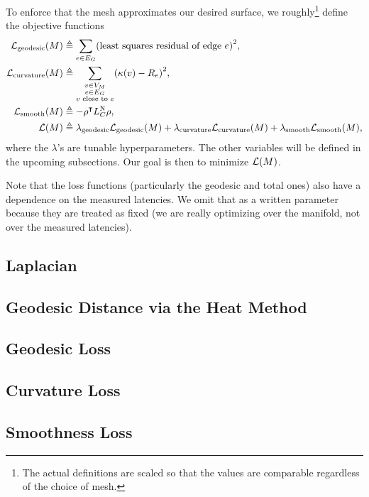 \documentclass[10pt]{article}
\newcommand*\delimeter[3]{
	\ensuremath{\mathopen{}\left#2 #1\right#3\mathclose{}{\vphantom{\left#2 #1\right#3}}}
}
\newcommand*\pof[1]{\delimeter{#1}{(}{)}}
\begin{document}
	To enforce that the mesh approximates our desired surface, we roughly\footnote{The actual definitions are scaled so that the values are comparable regardless of the choice of mesh.} define the objective functions \begin{align*}
		\mathcal{L}_{\mathrm{geodesic}}\pof{M} &\triangleq \sum_{e \in E_G} \pof{\text{least squares residual of edge \(e\)}}^2, \\
		\mathcal{L}_{\mathrm{curvature}}\pof{M} &\triangleq \sum_{\substack{v \in V_M \\ e \in E_G \\ \text{\(v\) close to \(e\)}}} \pof{\kappa\pof{v} - R_e}^2, \\
		\mathcal{L}_{\mathrm{smooth}}\pof{M} &\triangleq -\rho^\intercal L_C^{\text{N}}\rho, \\
		\mathcal{L}\pof{M} &\triangleq \lambda_{\mathrm{geodesic}}\mathcal{L}_{\mathrm{geodesic}}\pof{M} + \lambda_{\mathrm{curvature}}\mathcal{L}_{\mathrm{curvature}}\pof{M} + \lambda_{\mathrm{smooth}}\mathcal{L}_{\mathrm{smooth}}\pof{M},
	\end{align*} where the \(\lambda\)'s are tunable hyperparameters. The other variables will be defined in the upcoming subsections. Our goal is then to minimize \(\mathcal{L}\pof{M}\).

	Note that the loss functions (particularly the geodesic and total ones) also have a dependence on the measured latencies. We omit that as a written parameter because they are treated as fixed (we are really optimizing over the manifold, not over the measured latencies).

	\subsection{Laplacian}
	

	\subsection{Geodesic Distance via the Heat Method}
	

	\subsection{Geodesic Loss}
	

	\subsection{Curvature Loss}
	

	\subsection{Smoothness Loss}
	
\end{document}
